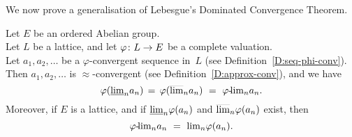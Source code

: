 \documentclass[main.tex]{subfiles}
\begin{document}
%
%
\noindent
We now prove a generalisation 
of Lebesgue's Dominated Convergence Theorem.
\begin{thm}[Lebesgue]
\label{T:lebesgue}
Let $E$ be an ordered Abelian group.\\
Let $L$ be a lattice,
and let $\varphi\colon L \rightarrow E$ be a 
complete valuation.\\
Let $a_1,a_2,\dotsc$ be a $\varphi$-convergent
sequence in~$L$
(see Definition~\ref{D:seq-phi-conv}). \\
Then $a_1,a_2,\dotsc$ is $\approx$-convergent
(see Definition~\ref{D:approx-conv}),
and we have
\begin{equation}
\label{T:lebesgue__1}
\varphi(\llim{n}a_n) \,=\, \varphi(\ulim{n} a_n) 
\ =\ 
\plim\varphi{n} a_n.
\end{equation}
Moreover,
if $E$ is a lattice,
and if $\smash{\underline{\lim}_{n}}\varphi(a_n)$ and $\smash{\overline{\lim}_{n}}\varphi(a_n)$ exist, 
then 
\begin{equation*}
{\varphi}\text{-}\!{\lim}_{n}a_n \ =\ {\lim}_n \varphi(a_n).
\end{equation*}
\end{thm}
\end{document}
